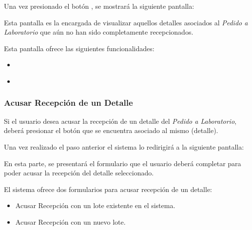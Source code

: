 \documentclass[a4paper,10pt,spanish]{sphinxmanual}
\begin{document}
Una vez presionado el botón , se mostrará la siguiente pantalla:


Esta pantalla es la encargada de visualizar aquellos detalles asociados al \emph{Pedido a Laboratorio} que aún no han sido completamente recepcionados.

Esta pantalla ofrece las siguientes funcionalidades:
\begin{itemize}
\item {} 
{\hyperref[receppedidosdelab:recepcion\string-detalle\string-rpl]{}}

\item {} 
{\hyperref[receppedidosdelab:registrar\string-pedido\string-rpl]{}}

\end{itemize}


\subsubsection{Acusar Recepción de un Detalle}
\label{receppedidosdelab:acusar-recepcion-de-un-detalle}\label{receppedidosdelab:recepcion-detalle-rpl}
Si el usuario desea acusar la recepción de un detalle del \emph{Pedido a Laboratorio}, deberá presionar el botón  que se encuentra asociado al mismo (detalle).


Una vez realizado el paso anterior el sistema lo redirigirá a la siguiente pantalla:


En esta parte, se presentará el formulario que el usuario deberá completar para poder acusar la recepción del detalle seleccionado.

El sistema ofrece dos formularios para acusar recepción de un detalle:
\begin{itemize}
\item {} 
Acusar Recepción con un lote existente en el sistema.

\item {} 
Acusar Recepción con un nuevo lote.

\end{itemize}
\end{document}

